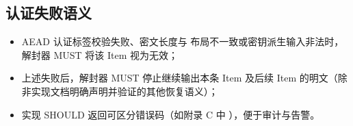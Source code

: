 \subsection{认证失败语义}\label{sec:auth-failure}
\begin{itemize}
  \item AEAD 认证标签校验失败、密文长度与  布局不一致或密钥派生输入非法时，解封器 MUST 将该 Item 视为无效；
  \item 上述失败后，解封器 MUST 停止继续输出本条 Item 及后续 Item 的明文（除非实现文档明确声明并验证的其他恢复语义）；
  \item 实现 SHOULD 返回可区分错误码（如附录 C 中 ），便于审计与告警。
\end{itemize}
